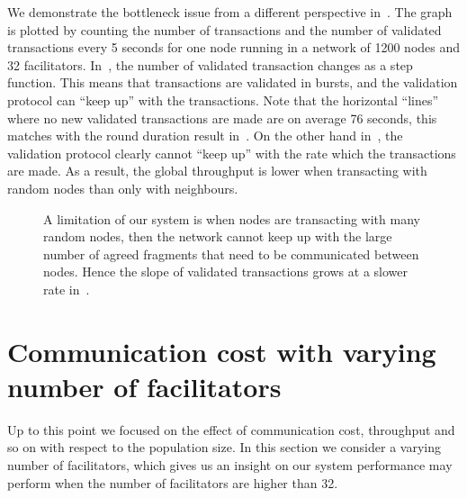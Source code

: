 We demonstrate the bottleneck issue from a different perspective in~.
The graph is plotted by counting the number of transactions and the number of validated transactions every 5 seconds for one node running in a network of 1200 nodes and 32 facilitators.
In~, the number of validated transaction changes as a step function.
This means that transactions are validated in bursts, and the validation protocol can ``keep up'' with the transactions.
Note that the horizontal ``lines'' where no new validated transactions are made are on average 76 seconds, this matches with the round duration result in~.
On the other hand in~, the validation protocol clearly cannot ``keep up'' with the rate which the transactions are made.
As a result, the global throughput is lower when transacting with random nodes than only with neighbours.

\begin{figure}[tb]
  \centering
  \caption{A limitation of our system is when nodes are transacting with many random nodes,
  then the network cannot keep up with the large number of agreed fragments that need to be communicated between nodes.
  Hence the slope of validated transactions grows at a slower rate in~.}
  \label{fig:backlog}
\end{figure}

\section{Communication cost with varying number of facilitators}
Up to this point we focused on the effect of communication cost, throughput and so on with respect to the population size.
In this section we consider a varying number of facilitators,
which gives us an insight on our system performance may perform when the number of facilitators are higher than 32.

